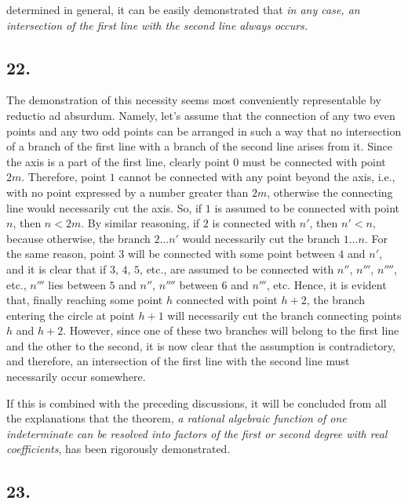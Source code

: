 \documentclass[12pt]{memoir}
\theoremstyle{plain}
\theoremstyle{remark}
\begin{document}
determined in general, it can be easily demonstrated that \textit{in any case, an intersection of the first line with the second line always occurs.}

\subsection*{22.}

The demonstration of this necessity seems most conveniently representable by reductio ad absurdum. Namely, let's assume that the connection of any two even points and any two odd points can be arranged in such a way that no intersection of a branch of the first line with a branch of the second line arises from it. Since the axis is a part of the first line, clearly point \(0\) must be connected with point \(2m\). Therefore, point \(1\) cannot be connected with any point beyond the axis, i.e., with no point expressed by a number greater than \(2m\), otherwise the connecting line would necessarily cut the axis. So, if \(1\) is assumed to be connected with point \(n\), then \(n < 2m\). By similar reasoning, if \(2\) is connected with \(n'\), then \(n' < n\), because otherwise, the branch \(2...n'\) would necessarily cut the branch \(1...n\). For the same reason, point \(3\) will be connected with some point between \(4\) and \(n'\), and it is clear that if \(3\), \(4\), \(5\), etc., are assumed to be connected with \(n''\), \(n'''\), \(n''''\), etc., \(n'''\) lies between \(5\) and \(n''\), \(n''''\) between \(6\) and \(n'''\), etc. Hence, it is evident that, finally reaching some point \(h\) connected with point \(h+2\), the branch entering the circle at point \(h+1\) will necessarily cut the branch connecting points \(h\) and \(h+2\). However, since one of these two branches will belong to the first line and the other to the second, it is now clear that the assumption is contradictory, and therefore, an intersection of the first line with the second line must necessarily occur somewhere.

If this is combined with the preceding discussions, it will be concluded from all the explanations that the theorem, \textit{a rational algebraic function of one indeterminate can be resolved into factors of the first or second degree with real coefficients}, has been rigorously demonstrated.

\subsection*{23.}
\end{document}
